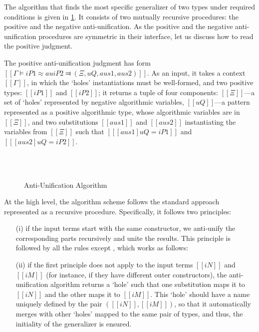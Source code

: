 The algorithm that finds the most specific generalizer of two types
under required conditions is given in \cref{fig:anti-unification}.
It consists of two mutually recursive procedures:
the positive and the negative anti-unification. 
As the positive and the negative anti-unification procedures
are symmetric in their interface, let us discuss how to read
the positive judgment. 

The positive anti-unification judgment has form
$[[Γ ⊨ iP1 ≈au iP2 ⫤ ( Ξ , uQ , aus1 , aus2 )]]$.
As an input, it takes a context $[[Γ]]$, in which the `holes'
instantiations must be well-formed, 
and two positive types: $[[iP1]]$ and $[[iP2]]$;
it returns a tuple of four components:
$[[Ξ]]$---a set of `holes' represented by negative algorithmic variables,
$[[uQ]]$---a pattern represented as a positive algorithmic type,
whose algorithmic variables are in $[[Ξ]]$,
and two substitutions $[[aus1]]$ and $[[aus2]]$
instantiating the variables from $[[Ξ]]$ such that
$[[ [aus1]uQ = iP1 ]]$ and $[[ [aus2]uQ = iP2 ]]$. 

\begin{figure}[h]
    \ottdefnAUAUPLabeled{}
    \hfill\\
    \hfill\\
    \ottdefnAUAUNLabeled{}
    \caption{Anti-Unification Algorithm}
    \label{fig:anti-unification}
\end{figure}

At the high level, the algorithm scheme follows
the standard approach \cite{plotkin1970:generalization}
represented as a recursive procedure. Specifically, it follows two principles:
\begin{enumerate}
  \item[(i)] if the input terms start with the same constructor,
    we anti-unify the corresponding parts recursively and 
    unite the results. This principle is followed by 
    all the rules except ,
    which works as follows:
  \item[(ii)] if the first principle does not apply to the input terms $[[iN]]$
    and $[[iM]]$ (for instance, if they have different outer constructors), the
    anti-unification algorithm returns a `hole' such that one substitution maps
    it to $[[iN]]$ and the other maps it to $[[iM]]$. This `hole'
    should have a name uniquely defined by the pair $([[iN]], [[iM]])$, so
    that it automatically merges with other `holes' mapped to the same
    pair of types, and thus, the initiality of the generalizer is ensured. 
\end{enumerate}

